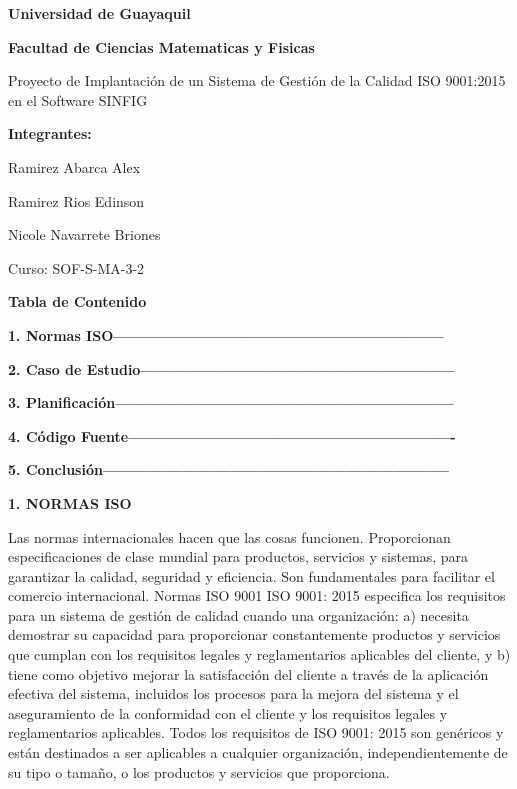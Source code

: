 \documentclass[10pt,a4paper]{article}
\begin{document}
\begin{center}
\textbf{Universidad de Guayaquil}

\textbf{Facultad de Ciencias Matematicas y Fisicas}

Proyecto de Implantación de un Sistema de Gestión de la Calidad ISO 9001:2015 en el Software SINFIG

\textbf{Integrantes:}

Ramirez Abarca Alex

Ramirez Rios Edinson 

Nicole Navarrete Briones

Curso: SOF-S-MA-3-2
\end{center}
\vspace{\baselineskip}
\textbf{Tabla de Contenido}
\vspace{\baselineskip}

\textbf{1. Normas ISO--------------------------------------------------------------}
\vspace{\baselineskip}

\textbf{2. Caso de Estudio-----------------------------------------------------------}
\vspace{\baselineskip}

\textbf{3. Planificación---------------------------------------------------------------}
\vspace{\baselineskip}

\textbf{4. Código Fuente-------------------------------------------------------------}
\vspace{\baselineskip}

\textbf{5. Conclusión-----------------------------------------------------------------}
\vspace{\baselineskip}

\textbf{1. NORMAS ISO}
\vspace{\baselineskip}

Las normas internacionales hacen que las cosas funcionen. Proporcionan especificaciones de clase mundial para productos, servicios y sistemas, para garantizar la calidad, seguridad y eficiencia. Son fundamentales para facilitar el comercio internacional.
Normas ISO 9001
ISO 9001: 2015 especifica los requisitos para un sistema de gestión de calidad cuando una organización:
a) necesita demostrar su capacidad para proporcionar constantemente productos y servicios que cumplan con los requisitos legales y reglamentarios aplicables del cliente, y
b) tiene como objetivo mejorar la satisfacción del cliente a través de la aplicación efectiva del sistema, incluidos los procesos para la mejora del sistema y el aseguramiento de la conformidad con el cliente y los requisitos legales y reglamentarios aplicables.
Todos los requisitos de ISO 9001: 2015 son genéricos y están destinados a ser aplicables a cualquier organización, independientemente de su tipo o tamaño, o los productos y servicios que proporciona.
\end{document}

